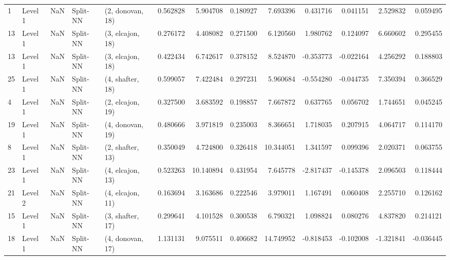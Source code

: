 \begin{tabular}{llrllrrrrrrrr}
1  &   Level 1 &    NaN &       Split-NN &  (2, donovan, 18) &   0.562828 &   5.904708 &  0.180927 &   7.693396 &             0.431716 &               0.041151 &            2.529832 &              0.059495 \\
13 &   Level 1 &    NaN &       Split-NN &  (3, elcajon, 18) &   0.276172 &   4.408082 &  0.271500 &   6.120560 &             1.980762 &               0.124097 &            6.660602 &              0.295455 \\
13 &   Level 1 &    NaN &       Split-NN &  (3, elcajon, 18) &   0.422434 &   6.742617 &  0.378152 &   8.524870 &            -0.353773 &              -0.022164 &            4.256292 &              0.188803 \\
25 &   Level 1 &    NaN &       Split-NN &  (4, shafter, 18) &   0.599057 &   7.422484 &  0.297231 &   5.960684 &            -0.554280 &              -0.044735 &            7.350394 &              0.366529 \\
4  &   Level 1 &    NaN &       Split-NN &  (2, elcajon, 19) &   0.327500 &   3.683592 &  0.198857 &   7.667872 &             0.637765 &               0.056702 &            1.744651 &              0.045245 \\
19 &   Level 1 &    NaN &       Split-NN &  (4, donovan, 19) &   0.480666 &   3.971819 &  0.235003 &   8.366651 &             1.718035 &               0.207915 &            4.064717 &              0.114170 \\
8  &   Level 1 &    NaN &       Split-NN &  (2, shafter, 13) &   0.350049 &   4.724800 &  0.326418 &  10.344051 &             1.341597 &               0.099396 &            2.020371 &              0.063755 \\
23 &   Level 1 &    NaN &       Split-NN &  (4, elcajon, 13) &   0.523263 &  10.140894 &  0.431954 &   7.645778 &            -2.817437 &              -0.145378 &            2.096503 &              0.118444 \\
21 &   Level 2 &    NaN &       Split-NN &  (4, elcajon, 11) &   0.163694 &   3.163686 &  0.222546 &   3.979011 &             1.167491 &               0.060408 &            2.255710 &              0.126162 \\
15 &   Level 1 &    NaN &       Split-NN &  (3, shafter, 17) &   0.299641 &   4.101528 &  0.300538 &   6.790321 &             1.098824 &               0.080276 &            4.837820 &              0.214121 \\
18 &   Level 1 &    NaN &       Split-NN &  (4, donovan, 17) &   1.131131 &   9.075511 &  0.406682 &  14.749952 &            -0.818453 &              -0.102008 &           -1.321841 &             -0.036445 \\

\end{tabular}
